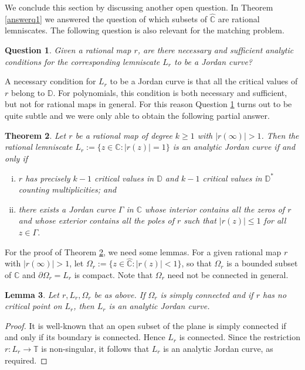 \documentclass{amsart}
\theoremstyle{plain}
\newtheorem{theorem}{Theorem}[section]
\newtheorem{lemma}[theorem]{Lemma}
\newtheorem{question}[theorem]{Question}
\theoremstyle{definition}
\theoremstyle{remark}
\newcommand{\mC}{\mathbb{C}}
\newcommand{\mD}{\mathbb{D}}
\newcommand{\mT}{\mathbb{T}}
\newcommand{\hC}{\widehat{\mathbb{C}}}
\begin{document}
We conclude this section by discussing another open question. In Theorem \ref{answerq1} we answered the question of which subsets of $\hC$ are rational lemniscates. The following question is also relevant for the matching problem.

\begin{question}
\label{q2}
Given a rational map $r$, are there necessary and sufficient analytic conditions for the corresponding lemniscate $L_r$ to be a Jordan curve?
\end{question}

A necessary condition for $L_r$ to be a Jordan curve is that all the critical values of $r$ belong to $\mD$. For polynomials, this condition is both necessary and sufficient, but not for rational maps in general. For this reason Question \ref{q2} turns out to be quite subtle and we were only able to obtain the following partial answer.

\begin{theorem}
\label{answerq2}
Let $r$ be a rational map of degree $k \geq 1$ with $|r(\infty)|>1$. Then the rational lemniscate $L_r:=\{z \in \hC:|r(z)|=1\}$ is an analytic Jordan curve if and only if
\begin{enumerate}[(i)]
\item $r$ has precisely $k-1$ critical values in $\mD$ and $k-1$ critical values in $\mD^*$ counting multiplicities; and
\item there exists a Jordan curve $\Gamma$ in $\mC$ whose interior contains all the zeros of $r$ and whose exterior contains all the poles of $r$ such that $|r(z)| \leq 1$ for all $z \in \Gamma$.
\end{enumerate}
\end{theorem}

For the proof of Theorem \ref{answerq2}, we need some lemmas. For a given rational map $r$ with $|r(\infty)|>1$, let $\Omega_r:=\{z \in \hC: |r(z)|<1\}$, so that $\Omega_r$ is a bounded subset of $\mC$ and $\partial \Omega_r = L_r$ is compact. Note that $\Omega_r$ need not be connected in general.

\begin{lemma}
\label{lemma:simplyconnected}
Let $r,L_r,\Omega_r$ be as above. If $\Omega_r$ is simply connected and if $r$ has no critical point on $L_r$, then $L_r$ is an analytic Jordan curve.
\end{lemma}

\begin{proof}
It is well-known that an open subset of the plane is simply connected if and only if its boundary is connected. Hence $L_r$ is connected. Since the restriction $r:L_r \to \mT$ is non-singular, it follows that $L_r$ is an analytic Jordan curve, as required.
\end{proof}
\end{document}
